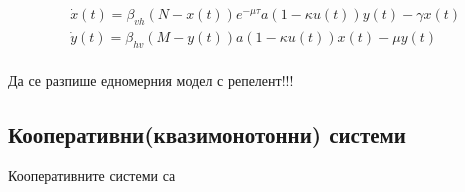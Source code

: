 \begin{equation}
  \label{eq:RepelentProblem}
  \begin{split}
    &\dot{x}(t) = \beta_{vh} (N-x(t)) e^{-\mu \tau} a (1-\kappa u(t)) y(t) - \gamma x(t) \\
    &\dot{y}(t) = \beta_{hv} (M-y(t)) a (1-\kappa u(t)) x(t) - \mu y(t) \\
  \end{split}
\end{equation}

\color{Red} Да се разпише едномерния модел с репелент!!!
\color{Black} \\

\subsection{Кооперативни(квазимонотонни) системи}
Кооперативните системи са
\cite{Capasso2008}
